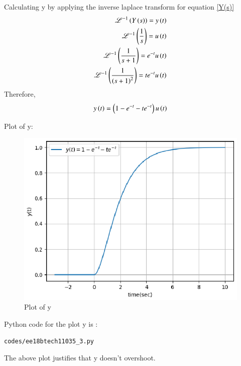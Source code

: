 \begin{enumerate}[label=\thesection.\arabic*.,ref=\thesection.\theenumi]
Calculating y by applying the inverse laplace transform for equation \eqref{Y(s)}
\begin{align}
\mathscr{L}^{-1}\left(Y\left(s\right)\right) = y\left(t\right)\\
\mathscr{L}^{-1} \left(\frac{1}{s}\right) = u\left(t\right)\\
\mathscr{L}^{-1} \left(\frac{1}{s+1}\right) = e^{-t}u\left(t\right)\\
\mathscr{L}^{-1}\left(\frac{1}{\left(s+1\right)^2}\right) = te^{-t}u\left(t\right)
\end{align}
Therefore,
\begin{align}
y\left(t\right)= \left(1-e^{-t}-te^{-t}\right)u\left(t\right)
\end{align}

Plot of y:
\begin{figure}[!h]
\includegraphics[width=\columnwidth]{./figures/ee18btech11035_3.eps}
\caption{Plot of y}
\label{fig:ee18btech11035_y(t)}
\end{figure}

Python code for the plot y is :
\begin{lstlisting}
codes/ee18btech11035_3.py
\end{lstlisting}

The above plot justifies that y doesn't overshoot.

\end{enumerate}
